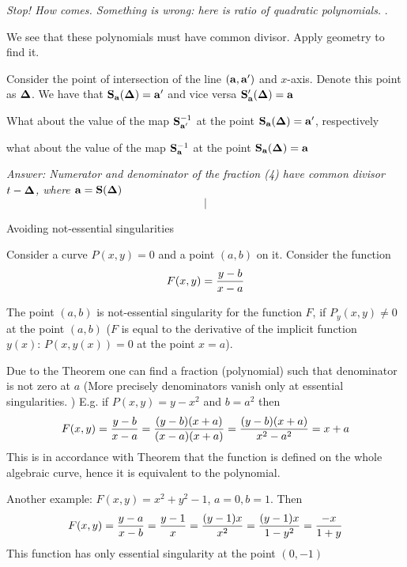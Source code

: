 {\it Stop! How comes. Something is wrong: here is ratio of quadratic polynomials. }.

We see that these polynomials must have common divisor. Apply geometry to find it.

  Consider the point of intersection of the line $({\bf a},{\bf a}')$ and $x$-axis. Denote this point
  as $\bf\Delta$.  We have that  ${\bf S}_{\bf a}({\bf\Delta})={\bf a}'$ and vice versa  ${\bf S}_{\bf a}'({\bf\Delta})={\bf a}$

  What about the value of the map ${\bf S}_{{\bf a}'}^{-1}$ at the point ${\bf S}_{\bf a}({\bf\Delta})={\bf a}'$, respectively

  what about the value of the map ${\bf S}_{{\bf a}}^{-1}$ at the point ${\bf S}_{\bf a}({\bf\Delta})={\bf a}$


{\it Answer: Numerator and denominator of the fraction (4) have common divisor $t-\bf\Delta$, where
  ${\bf a}={\bf S}({\bf\Delta})$}
$$|$$
  \centerline{Avoiding not-essential singularities}


  Consider a curve $P(x,y)=0$ and a point $(a,b)$ on it. Consider the function
                  $$
                F(x,y)={y-b\over x-a}
                  $$

   The point $(a,b)$ is not-essential singularity for the function $F$,
   if $P_y(x,y)\not=0$ at the point $(a,b)$ ($F$ is equal to the derivative of the implicit function
   $y(x)\colon\, P(x,y(x))=0$ at the point $x=a$).

   Due to the Theorem one can find a fraction (polynomial) such that denominator is not zero at $a$
   (More precisely denominators vanish only at essential singularities. ) E.g. if $P(x,y)=y-x^2$
   and $b=a^2$ then
                  $$
            F(x,y)={y-b\over x-a}={(y-b)(x+a)\over (x-a)(x+a)}={(y-b)(x+a)\over x^2-a^2}=x+a
                  $$
This is in accordance with Theorem that the function is defined on the whole algebraic curve,
hence it is equivalent to the polynomial.


Another example:  $F(x,y)=x^2+y^2-1$, $a=0,b=1$. Then
                    $$
            F(x,y)={y-a\over x-b}={y-1\over x}={(y-1)x\over  x^2}={(y-1)x\over 1-y^2}={-x\over 1+y}
                    $$
This function has only essential singularity at the point $(0,-1)$

\bye
